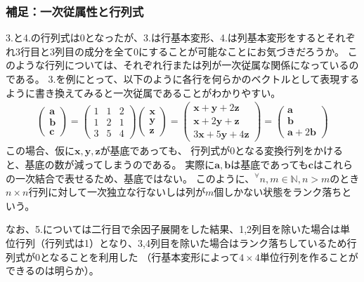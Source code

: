 \documentclass[10pt]{ujarticle}
\begin{document}
\subsubsection{補足：一次従属性と行列式}
3.と4.の行列式は0となったが、3.は行基本変形、4.は列基本変形をするとそれぞれ3行目と3列目の成分を全て0にすることが可能なことにお気づきだろうか。
このような行列については、それぞれ行または列が一次従属な関係になっているのである。
3.を例にとって、以下のように各行を何らかのベクトルとして表現するように書き換えてみると一次従属であることがわかりやすい。
$$
\begin{aligned}
  \begin{pmatrix}
    \mathbf{a}\\\mathbf{b}\\\mathbf{c}
  \end{pmatrix}=\begin{pmatrix}
    1 & 1 & 2\\
    1 & 2 & 1\\
    3 & 5 & 4
  \end{pmatrix}\begin{pmatrix}
    \mathbf{x}\\\mathbf{y}\\\mathbf{z}
  \end{pmatrix}=\begin{pmatrix}
      \mathbf{x}+\mathbf{y}+2\mathbf{z}\\
      \mathbf{x}+2\mathbf{y}+\mathbf{z}\\
      3\mathbf{x}+5\mathbf{y}+4\mathbf{z}
    \end{pmatrix}=\begin{pmatrix}
      \mathbf{a}\\\mathbf{b}\\\mathbf{a}+2\mathbf{b}
    \end{pmatrix}
\end{aligned}
$$
この場合、仮に$\mathbf{x},\mathbf{y},\mathbf{z}$が基底であっても、
行列式が0となる変換行列をかけると、基底の数が減ってしまうのである。
実際に$\mathbf{a},\mathbf{b}$は基底であっても$\mathbf{c}$はこれらの一次結合で表せるため、基底ではない。
このように、$^\forall n,m\in\mathbb{N},n>m$のとき$n\times n$行列に対して一次独立な行ないしは列が$m$個しかない状態をランク落ちという。

なお、5.については二行目で余因子展開をした結果、1,2列目を除いた場合は単位行列（行列式は1）となり、3,4列目を除いた場合はランク落ちしているため行列式が0となることを利用した
（行基本変形によって$4\times4$単位行列を作ることができるのは明らか）。
\end{document}
